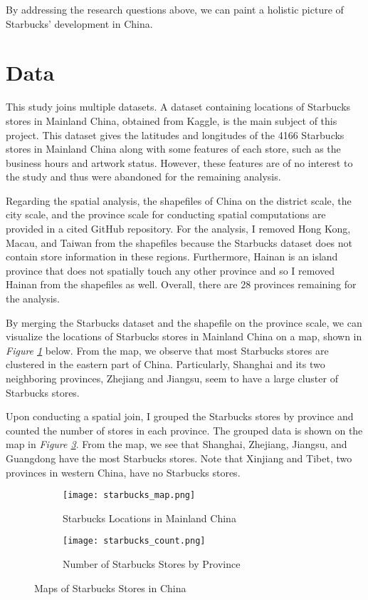 \documentclass{article}
\begin{document}
By addressing the research questions above, we can paint a holistic picture of Starbucks’ development in China.

\section{Data}

This study joins multiple datasets. A dataset containing locations of Starbucks stores in Mainland China, obtained from Kaggle, is the main subject of this project. This dataset gives the latitudes and longitudes of the 4166 Starbucks stores in Mainland China along with some features of each store, such as the business hours and artwork status. However, these features are of no interest to the study and thus were abandoned for the remaining analysis.

Regarding the spatial analysis, the shapefiles of China on the district scale, the city scale, and the province scale for conducting spatial computations are provided in a cited GitHub repository. For the analysis, I removed Hong Kong, Macau, and Taiwan from the shapefiles because the Starbucks dataset does not contain store information in these regions. Furthermore, Hainan is an island province that does not spatially touch any other province and so I removed Hainan from the shapefiles as well. Overall, there are 28 provinces remaining for the analysis.

By merging the Starbucks dataset and the shapefile on the province scale, we can visualize the locations of Starbucks stores in Mainland China on a map, shown in \textit{Figure \ref{fig:starbucks_map}} below. From the map, we observe that most Starbucks stores are clustered in the eastern part of China. Particularly, Shanghai and its two neighboring provinces, Zhejiang and Jiangsu, seem to have a large cluster of Starbucks stores.

Upon conducting a spatial join, I grouped the Starbucks stores by province and counted the number of stores in each province. The grouped data is shown on the map in \textit{Figure \ref{fig:starbucks_count}}. From the map, we see that Shanghai, Zhejiang, Jiangsu, and Guangdong have the most Starbucks stores. Note that Xinjiang and Tibet, two provinces in western China, have no Starbucks stores.

\begin{figure}[htbp]
    \begin{subfigure}[b]{0.48\textwidth}
        \centering
        \texttt{[image: starbucks\_map.png]}
        \caption{Starbucks Locations in Mainland China}
        \label{fig:starbucks_map}
    \end{subfigure}
    \hfill
    \begin{subfigure}[b]{0.48\textwidth}
        \centering
        \texttt{[image: starbucks\_count.png]}
        \caption{Number of Starbucks Stores by Province}
        \label{fig:starbucks_count}
    \end{subfigure}
    \caption{Maps of Starbucks Stores in China}
\end{figure}
\end{document}
